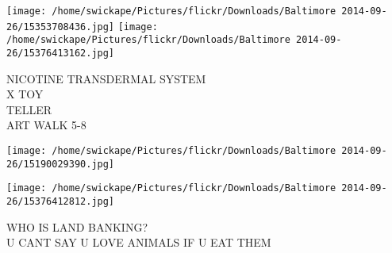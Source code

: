 \documentclass[10pt,letterpaper]{article}
\begin{document}
\texttt{[image: /home/swickape/Pictures/flickr/Downloads/Baltimore 2014-09-26/15353708436.jpg]}
\texttt{[image: /home/swickape/Pictures/flickr/Downloads/Baltimore 2014-09-26/15376413162.jpg]}

NICOTINE TRANSDERMAL SYSTEM\\
X TOY\\
TELLER\\
ART WALK 5{-}8\\
\pagebreak

\texttt{[image: /home/swickape/Pictures/flickr/Downloads/Baltimore 2014-09-26/15190029390.jpg]}

\vspace{0.25in}
\texttt{[image: /home/swickape/Pictures/flickr/Downloads/Baltimore 2014-09-26/15376412812.jpg]}

WHO IS LAND BANKING?\\
U CANT SAY U LOVE ANIMALS IF U EAT THEM\\
\pagebreak
\end{document}
